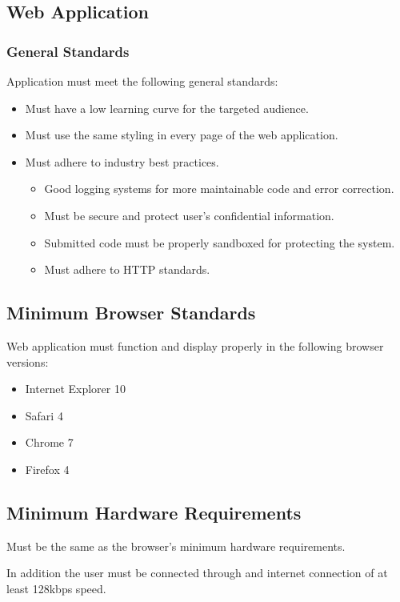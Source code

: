 \label{sec:stand}

\subsection{Web Application}

\subsubsection{General Standards}

Application must meet the following general standards:

\begin{itemize}
\item Must have a low learning curve for the targeted audience.
\item Must use the same styling in every page of the web application.
\item Must adhere to industry best practices.
\begin{itemize}
\item Good logging systems for more maintainable code and error correction.
\item Must be secure and protect user's confidential information.
\item Submitted code must be properly sandboxed for protecting the system.
\item Must adhere to HTTP standards.
\end{itemize}
\end{itemize}

\subsection{Minimum Browser Standards}

Web application must function and display properly in the following browser
versions:
\begin{itemize}
\item Internet Explorer 10
\item Safari 4
\item Chrome 7
\item Firefox 4
\end{itemize}

\subsection{Minimum Hardware Requirements}
\item Must be the same as the browser's minimum hardware requirements.
\item In addition the user must be connected through and internet connection of
at least 128kbps speed.
